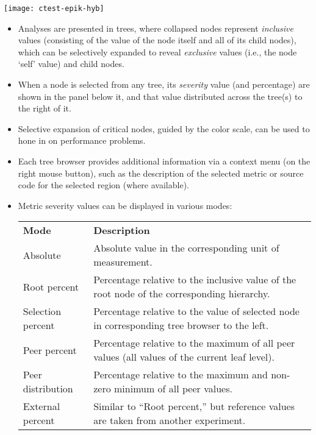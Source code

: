 \documentclass[a4paper]{article}
\begin{document}
\texttt{[image: ctest-epik-hyb]}

\vspace*{-2mm}
\begin{itemize}
  \item Analyses are presented in trees, where collapsed nodes represent
{\em inclusive\/} values (consisting of the value of the node itself and all of
its child nodes), which can be selectively expanded to reveal {\em exclusive\/}
values (i.e., the node `self' value) and child nodes.
  \item When a node is selected from any tree,
        its {\em severity\/} value (and percentage) are shown in the panel below it,
        and that value distributed across the tree(s) to the right of it.

  \item Selective expansion of critical nodes, guided by the
color scale, can be used to hone in on performance problems.

  \item Each tree browser provides additional information via a context menu
        (on the right mouse button), such as the description of the selected metric
        or source code for the selected region (where available).
  \item Metric severity values can be displayed in various modes: \\[1ex]
    \begin{tabularx}{\linewidth}{lX}
      \textbf{Mode} & \textbf{Description} \\

      Absolute &
        Absolute value in the corresponding unit of measurement. \\

      Root percent &
        Percentage relative to the inclusive value of the root node of the
        corresponding hierarchy. \\

      Selection percent &
        Percentage relative to the value of selected node in corresponding
        tree browser to the left. \\

      Peer percent &
        Percentage relative to the maximum of all peer values (all values of
        the current leaf level). \\

      Peer distribution &
        Percentage relative to the maximum and non-zero minimum of all peer
        values. \\

      External percent &
        Similar to ``Root percent,'' but reference values are taken from
        another experiment.
    \end{tabularx}
\end{itemize}
\end{document}
